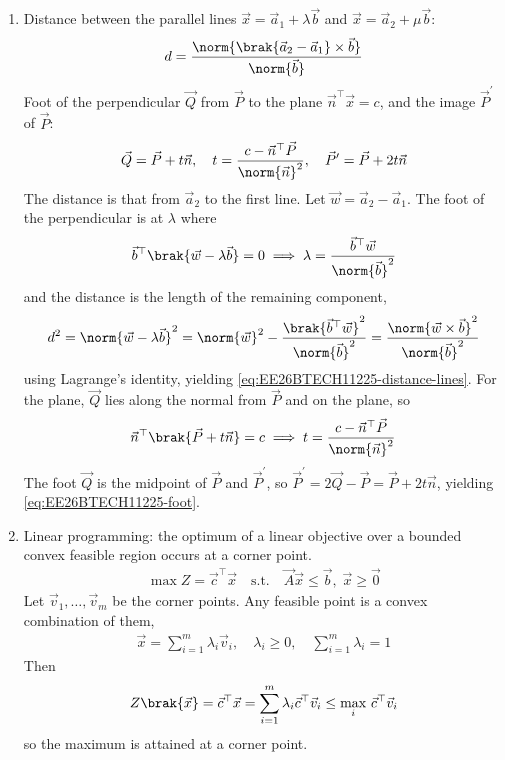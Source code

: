 \begin{enumerate}[label=\thesubsection.\arabic*, ref=\thesubsection.\theenumi]
\item Distance between the parallel lines $\vec{x} = \vec{a}_1 + \lambda\vec{b}$ and $\vec{x} = \vec{a}_2 + \mu\vec{b}$:
\begin{align}
	d = \frac{\norm{\brak{\vec{a}_2 - \vec{a}_1} \times \vec{b}}}{\norm{\vec{b}}}
	\label{eq:EE26BTECH11225-distance-lines}
\end{align}
Foot of the perpendicular $\vec{Q}$ from $\vec{P}$ to the plane $\vec{n}^{\top}\vec{x} = c$, and the image $\vec{P}^{\prime}$ of $\vec{P}$:
\begin{align}
	\vec{Q} = \vec{P} + t\vec{n}, \quad t = \frac{c - \vec{n}^{\top}\vec{P}}{\norm{\vec{n}}^2}, \quad \vec{P}^{\prime} = \vec{P} + 2t\vec{n}
	\label{eq:EE26BTECH11225-foot}
\end{align}
\solution
The distance is that from $\vec{a}_2$ to the first line. Let $\vec{w} = \vec{a}_2 - \vec{a}_1$. The foot of the perpendicular is at $\lambda$ where
\begin{align}
	\vec{b}^{\top}\brak{\vec{w} - \lambda\vec{b}} = 0
	\implies \lambda = \frac{\vec{b}^{\top}\vec{w}}{\norm{\vec{b}}^2}
\end{align}
and the distance is the length of the remaining component,
\begin{align}
	d^2 = \norm{\vec{w} - \lambda\vec{b}}^2 = \norm{\vec{w}}^2 - \frac{\brak{\vec{b}^{\top}\vec{w}}^2}{\norm{\vec{b}}^2}
	= \frac{\norm{\vec{w} \times \vec{b}}^2}{\norm{\vec{b}}^2}
\end{align}
using Lagrange's identity, yielding \eqref{eq:EE26BTECH11225-distance-lines}. For the plane, $\vec{Q}$ lies along the normal from $\vec{P}$ and on the plane, so
\begin{align}
	\vec{n}^{\top}\brak{\vec{P} + t\vec{n}} = c
	\implies t = \frac{c - \vec{n}^{\top}\vec{P}}{\norm{\vec{n}}^2}
\end{align}
The foot $\vec{Q}$ is the midpoint of $\vec{P}$ and $\vec{P}^{\prime}$, so $\vec{P}^{\prime} = 2\vec{Q} - \vec{P} = \vec{P} + 2t\vec{n}$, yielding \eqref{eq:EE26BTECH11225-foot}.

\item Linear programming: the optimum of a linear objective over a bounded convex feasible region occurs at a corner point.
\begin{align}
	\max Z = \vec{c}^{\top}\vec{x} \quad \text{s.t.} \quad \vec{A}\vec{x} \leq \vec{b}, \; \vec{x} \geq \vec{0}
	\label{eq:EE26BTECH11225-lpp}
\end{align}
\solution
Let $\vec{v}_1, \ldots, \vec{v}_m$ be the corner points. Any feasible point is a convex combination of them,
\begin{align}
	\vec{x} = \sum_{i=1}^{m}\lambda_i\vec{v}_i, \quad \lambda_i \geq 0, \quad \sum_{i=1}^{m}\lambda_i = 1
\end{align}
Then
\begin{align}
	Z\brak{\vec{x}} = \vec{c}^{\top}\vec{x} = \sum_{i=1}^{m}\lambda_i\vec{c}^{\top}\vec{v}_i
	\leq \max_i\, \vec{c}^{\top}\vec{v}_i
\end{align}
so the maximum is attained at a corner point.


\end{enumerate}
